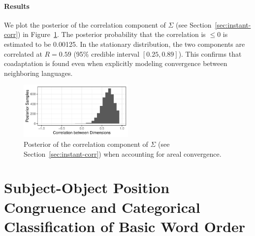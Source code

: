 \documentclass[11pt,a4paper]{article}
\begin{document}
\paragraph{Results}
We plot the posterior of the correlation component of $\Sigma$ (see Section~\ref{sec:instant-corr}) in Figure~\ref{fig:posterior-area-time}.
The posterior probability that the correlation is $\leq 0$ is estimated to be 0.00125.
In the stationary distribution, the two components are correlated at $R = 0.59$ (95\% credible interval $[0.25, 0.89]$).
This confirms that coadaptation is found even when explicitly modeling convergence between neighboring languages.


\begin{figure}
	\begin{center}
    \includegraphics[width=0.5\textwidth]{../change/ornuhl-binom-geo-time/fits/corr_sigma.pdf}
	\end{center}
	\caption{Posterior of the correlation component of $\Sigma$ (see Section~\ref{sec:instant-corr}) when accounting for areal convergence.}\label{fig:posterior-area-time}
\end{figure}








\section{Subject-Object Position Congruence and Categorical Classification of Basic Word Order}\label{sec:categorical}
\end{document}
